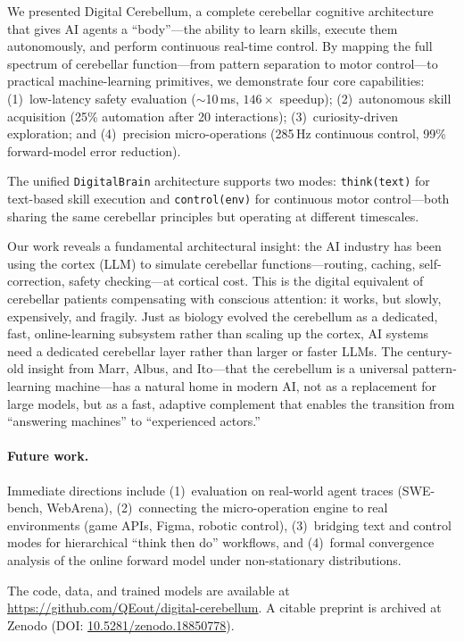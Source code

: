 \documentclass[11pt,a4paper]{article}
\begin{document}
We presented Digital Cerebellum, a complete cerebellar cognitive architecture that gives AI agents a ``body''---the ability to learn skills, execute them autonomously, and perform continuous real-time control.
By mapping the full spectrum of cerebellar function---from pattern separation to motor control---to practical machine-learning primitives, we demonstrate four core capabilities:
(1)~low-latency safety evaluation ($\sim$10\,ms, $146\times$ speedup);
(2)~autonomous skill acquisition (25\% automation after 20 interactions);
(3)~curiosity-driven exploration; and
(4)~precision micro-operations (285\,Hz continuous control, 99\% forward-model error reduction).

The unified \texttt{DigitalBrain} architecture supports two modes: \texttt{think(text)} for text-based skill execution and \texttt{control(env)} for continuous motor control---both sharing the same cerebellar principles but operating at different timescales.

Our work reveals a fundamental architectural insight: the AI industry has been using the cortex (LLM) to simulate cerebellar functions---routing, caching, self-correction, safety checking---at cortical cost.
This is the digital equivalent of cerebellar patients compensating with conscious attention: it works, but slowly, expensively, and fragily.
Just as biology evolved the cerebellum as a dedicated, fast, online-learning subsystem rather than scaling up the cortex, AI systems need a dedicated cerebellar layer rather than larger or faster LLMs.
The century-old insight from Marr, Albus, and Ito---that the cerebellum is a universal pattern-learning machine---has a natural home in modern AI, not as a replacement for large models, but as a fast, adaptive complement that enables the transition from ``answering machines'' to ``experienced actors.''

\paragraph{Future work.}
Immediate directions include (1)~evaluation on real-world agent traces (SWE-bench, WebArena), (2)~connecting the micro-operation engine to real environments (game APIs, Figma, robotic control), (3)~bridging text and control modes for hierarchical ``think then do'' workflows, and (4)~formal convergence analysis of the online forward model under non-stationary distributions.

The code, data, and trained models are available at \url{https://github.com/QEout/digital-cerebellum}.
A citable preprint is archived at Zenodo (DOI: \href{https://doi.org/10.5281/zenodo.18850778}{10.5281/zenodo.18850778}).
\end{document}
